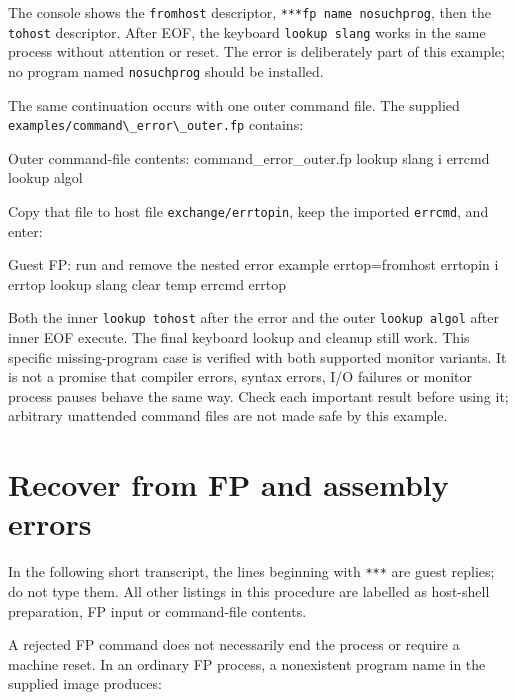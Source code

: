 The console shows the \passthrough{\lstinline!fromhost!} descriptor, \passthrough{\lstinline!***fp name nosuchprog!}, then the \passthrough{\lstinline!tohost!} descriptor. After EOF, the keyboard \passthrough{\lstinline!lookup slang!} works in the same process without attention or reset. The error is deliberately part of this example; no program named \passthrough{\lstinline!nosuchprog!} should be installed.

The same continuation occurs with one outer command file. The supplied \passthrough{\lstinline!examples/command\_error\_outer.fp!} contains:

\begin{commandexample}{Outer command-file contents: command\_error\_outer.fp}
lookup slang
i errcmd
lookup algol
\end{commandexample}

Copy that file to host file \passthrough{\lstinline!exchange/errtopin!}, keep the imported \passthrough{\lstinline!errcmd!}, and enter:

\begin{commandexample}{Guest FP: run and remove the nested error example}
errtop=fromhost errtopin
i errtop
lookup slang
clear temp errcmd errtop
\end{commandexample}

Both the inner \passthrough{\lstinline!lookup tohost!} after the error and the outer \passthrough{\lstinline!lookup algol!} after inner EOF execute. The final keyboard lookup and cleanup still work. This specific missing-program case is verified with both supported monitor variants. It is not a promise that compiler errors, syntax errors, I/O failures or monitor process pauses behave the same way. Check each important result before using it; arbitrary unattended command files are not made safe by this example.

\section{Recover from FP and assembly errors}\label{recover-from-fp-and-assembly-errors}

In the following short transcript, the lines beginning with \passthrough{\lstinline!***!} are guest replies; do not type them. All other listings in this procedure are labelled as host-shell preparation, FP input or command-file contents.

A rejected FP command does not necessarily end the process or require a machine reset. In an ordinary FP process, a nonexistent program name in the supplied image produces:

